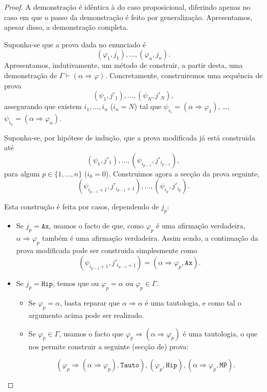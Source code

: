 \documentclass{report}
\theoremstyle{definition}
\theoremstyle{remark}
\newcommand{\imply}{\mathbin{\Rightarrow}}
\begin{document}
	\begin{proof}
	A demonstração é idêntica à do caso proposicional, diferindo apenas no caso em que o passo da demonstração é feito por generalização. Apresentamos, apesar disso, a demonstração completa.
	
	Suponha-se que a prova dada no enunciado é
	\[(\varphi_1, j_1), \dots, (\varphi_n, j_n).\]
	Apresentamos, indutivamente, um método de construir, a partir desta, uma demonstração de $\Gamma \vdash (\alpha \imply \varphi)$. Concretamente, construiremos uma sequência de prova
	\[(\psi_1, j'_1), \dots, (\psi_N, j'_N),\]
	assegurando que existem $i_1, \dots, i_n$ ($i_n = N$) tal que $\psi_{i_1} = (\alpha \imply \varphi_1)$, \dots, $\psi_{i_n} = (\alpha \imply \varphi_n)$.
	
	Suponha-se, por hipótese de indução, que a prova modificada já está construida até
	\[(\psi_1, j'_1), \dots, (\psi_{i_{p-1}}, j'_{i_{p-1}}),\]
	para algum $p \in \{1, \dots, n\}$ ($i_0 = 0$). Construimos agora a secção da prova seguinte,
	\[(\psi_{i_{p-1}+1}, j'_{i_{p-1}+1}), \dots, (\psi_{i_p}, j'_{i_p}).\]
	
	Esta construção é feita por casos, dependendo de $j_p$:
	
	\begin{itemize}
	\item Se $j_p = \mathtt{Ax}$, usamos o facto de que, como $\varphi_p$ é uma afirmação verdadeira, $\alpha \imply \varphi_p$ também é uma afirmação verdadeira. Assim sendo, a continuação da prova modificada pode ser construida simplesmente como
	\[(\psi_{i_{p-1}+1}, j'_{i_{p-1}+1}) = (\alpha \imply \varphi_p, \mathtt{Ax}).\]
	
	\item Se $j_p = \mathtt{Hip}$, temos que ou $\varphi_p = \alpha$ ou $\varphi_p \in \Gamma$.
	
	\begin{itemize}
	\item Se $\varphi_p = \alpha$, basta reparar que $\alpha \imply \alpha$ é uma tautologia, e como tal o argumento acima pode ser realizado.
	
	\item Se $\varphi_p \in \Gamma$, usamos o facto que $\varphi_p \imply (\alpha \imply \varphi_p)$ é uma tautologia, o que nos permite construir a seguinte (secção de) prova:
	
	\[(\varphi_p \imply (\alpha \imply \varphi_p), \mathtt{Tauto}), (\varphi_p, \mathtt{Hip}), (\alpha \imply \varphi_p, \mathtt{MP}).\]
	\end{itemize}
	

\end{itemize}
\end{proof}
\end{document}
